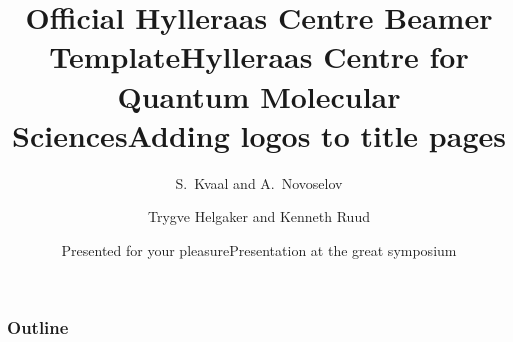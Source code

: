 \documentclass[8pt]{beamer} %
\begin{document}
\title{Official Hylleraas Centre Beamer Template}
\date{Presented for your pleasure}
\author{S.~Kvaal and A.~Novoselov}

\begin{frame}
  \titlepage
\end{frame}


\title{Hylleraas Centre for Quantum Molecular Sciences}
\date[ISPN ’80]{Presentation at the great symposium}
\author[Helgaker]{Trygve Helgaker and Kenneth Ruud}


\begin{frame}[dark]
  \titlepage
\end{frame}


\begin{frame}[image 2]
  \titlepage
\end{frame}

\begin{frame}[image 3]
  \titlepage
\end{frame}

\begin{frame}[image 4]
  \titlepage
\end{frame}

\title{Adding logos to title pages}
\begin{frame}[image 1]
  \titlepage
\end{frame}


\begin{frame}
  \frametitle{Outline}
  \tableofcontents
\end{frame}
\end{document}
